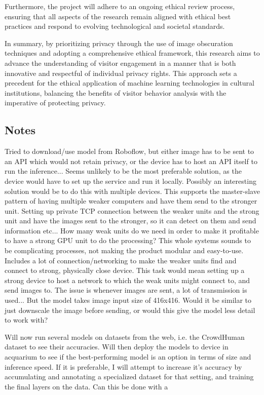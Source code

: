 Furthermore, the project will adhere to an ongoing ethical review process, ensuring that all aspects of the research remain aligned with ethical best practices and respond to evolving technological and societal standards.

In summary, by prioritizing privacy through the use of image obscuration techniques and adopting a comprehensive ethical framework, this research aims to advance the understanding of visitor engagement in a manner that is both innovative and respectful of individual privacy rights. This approach sets a precedent for the ethical application of machine learning technologies in cultural institutions, balancing the benefits of visitor behavior analysis with the imperative of protecting privacy.



\subsection*{Notes}
Tried to download/use model from Roboflow, but either image has to be sent to an API which would not retain privacy, or the device has to host an API itself to run the inference... Seems unlikely to be the most preferable solution, as the device would have to set up the service and run it locally. Possibly an interesting solution would be to do this with multiple devices. This supports the master-slave pattern of having multiple weaker computers and have them send to the stronger unit. Setting up private TCP connection between the weaker units and the strong unit and have the images sent to the stronger, so it can detect on them and send information etc... How many weak units do we need in order to make it profitable to have a strong GPU unit to do the processing? This whole systems sounds to be complicating processes, not making the product modular and easy-to-use. Includes a lot of connection/networking to make the weaker units find and connect to strong, physically close device.
    This task would mean setting up a strong device to host a network to which the weak units might connect to, and send images to. The issue is whenever images are sent, a lot of transmission is used... But the model takes image input size of 416x416. Would it be similar to just downscale the image before sending, or would this give the model less detail to work with?

Will now run several models on datasets from the web, i.e. the CrowdHuman dataset to see their accuracies. Will then deploy the models to device in acquarium to see if the best-performing model is an option in terms of size and inference speed. If it is preferable, I will attempt to increase it's accuracy by accumulating and annotating a specialized dataset for that setting, and training the final layers on the data. Can this be done with a 





